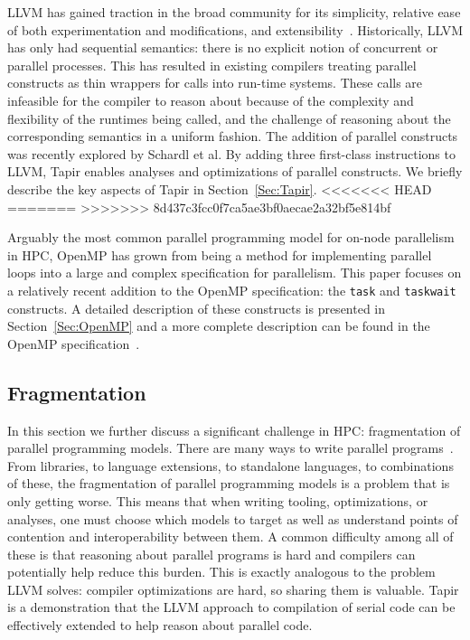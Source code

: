 \documentclass[sigconf]{acmart}
\begin{document}
LLVM has gained traction in the broad community for its simplicity,
relative ease of both experimentation and modifications, and extensibility~\cite{lattner2004llvm}.
Historically, LLVM has only had sequential semantics: there is no explicit notion
of concurrent or parallel processes. This has resulted in existing compilers
treating parallel constructs as thin wrappers for calls into run-time
systems. These calls are infeasible for the compiler to reason about because of
the complexity and flexibility of the runtimes being called, and the challenge
of reasoning about the corresponding semantics in a uniform fashion. The
addition of parallel constructs was recently explored by Schardl et
al.
By adding three first-class instructions to LLVM, Tapir
enables analyses and optimizations of parallel constructs. We briefly describe
the key aspects of Tapir in Section~\ref{Sec:Tapir}.
<<<<<<< HEAD
=======
>>>>>>> 8d437c3fcc0f7ca5ae3bf0aecae2a32bf5e814bf

Arguably the most common parallel programming model for on-node parallelism
in HPC, OpenMP has grown from being a method for implementing parallel loops into a
large and complex specification for parallelism. This paper focuses on a
relatively recent addition to the OpenMP specification: the \texttt{task}
and \texttt{taskwait} constructs. A detailed description of these constructs
is presented in Section~\ref{Sec:OpenMP} and a more complete description can
be found in the OpenMP specification~\cite{openmp}.

\subsection{Fragmentation}

In this section we further discuss a significant challenge in HPC:
fragmentation of parallel programming models. There are many ways to write
parallel programs~\cite{openmp, qthreads, chapel, cilk, kokkos, legion, upc,
mpi}.  From libraries, to language extensions, to standalone languages, to
combinations of these, the fragmentation of parallel programming models is a
problem that is only getting worse. This means that when writing tooling,
optimizations, or analyses, one must choose which models to target as well as
understand points of contention and interoperability between them. A common
difficulty among all of these is that reasoning about parallel programs is hard
and compilers can potentially help reduce this burden. This is exactly
analogous to the problem LLVM solves: compiler optimizations are hard, so
sharing them is valuable. Tapir is a demonstration that the LLVM approach to
compilation of serial code can be effectively extended to help reason about
parallel code.
\end{document}
